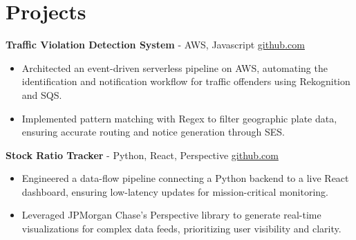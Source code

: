 \documentclass[11pt]{article}       %
\begin{document}

\vspace{-18.5pt}

\section*{Projects}

\textbf{Traffic Violation Detection System}{ - AWS, Javascript} \hfill \href{https://github.com/Monica20030707/AWS_rekonigition-N-read-database}{github.com} \\
\vspace{-9pt}
\begin{itemize}
  \item Architected an event-driven serverless pipeline on AWS, automating the identification and notification workflow for traffic offenders using Rekognition and SQS.
  \item Implemented pattern matching with Regex to filter geographic plate data, ensuring accurate routing and notice generation through SES.
\end{itemize}

\textbf{Stock Ratio Tracker}{ - Python, React, Perspective} \hfill \href{https://github.com/Monica20030707/tradingDashboard-UI}{github.com} \\
\vspace{-9pt}
\begin{itemize}
  \item Engineered a data-flow pipeline connecting a Python backend to a live React dashboard, ensuring low-latency updates for mission-critical monitoring.
  \item Leveraged JPMorgan Chase’s Perspective library to generate real-time visualizations for complex data feeds, prioritizing user visibility and clarity.
\end{itemize}
\end{document}
